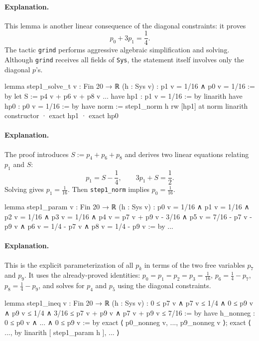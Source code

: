 \documentclass[11pt]{article}
\begin{document}
\paragraph{Explanation.}
This lemma is another linear consequence of the diagonal constraints: it proves
\[
p_0+3p_1=\frac14.
\]
The tactic \texttt{grind} performs aggressive algebraic simplification and solving.  Although \texttt{grind} receives all fields of \texttt{Sys}, the statement itself involves only the diagonal $p$'s.

\begin{LeanCode}
lemma step1_solve_t {v : Fin 20 → ℝ} (h : Sys v) : p1 v = 1/16 ∧ p0 v = 1/16 := by
  let S := p4 v + p6 v + p8 v
  ...
  have hp1 : p1 v = 1/16 := by linarith
  have hp0 : p0 v = 1/16 := by
    have norm := step1_norm h
    rw [hp1] at norm
    linarith
  constructor
  · exact hp1
  · exact hp0
\end{LeanCode}

\paragraph{Explanation.}
The proof introduces $S:=p_4+p_6+p_8$ and derives two linear equations relating $p_1$ and $S$:
\[
p_1 = S-\frac14,\qquad 3p_1+S=\frac12.
\]
Solving gives $p_1=\frac1{16}$.  Then \texttt{step1\_norm} implies $p_0=\frac1{16}$.

\begin{LeanCode}
lemma step1_param {v : Fin 20 → ℝ} (h : Sys v) :
  p0 v = 1/16 ∧ p1 v = 1/16 ∧ p2 v = 1/16 ∧ p3 v = 1/16 ∧
  p4 v = p7 v + p9 v - 3/16 ∧ p5 v = 7/16 - p7 v - p9 v ∧
  p6 v = 1/4 - p7 v ∧ p8 v = 1/4 - p9 v := by
  ...
\end{LeanCode}

\paragraph{Explanation.}
This is the explicit parameterization of all $p_k$ in terms of the two free variables $p_7$ and $p_9$.
It uses the already-proved identities:
$p_0=p_1=p_2=p_3=\frac1{16}$,
$p_6=\frac14-p_7$,
$p_8=\frac14-p_9$,
and solves for $p_4$ and $p_5$ using the diagonal constraints.

\begin{LeanCode}
lemma step1_ineq {v : Fin 20 → ℝ} (h : Sys v) :
  0 ≤ p7 v ∧ p7 v ≤ 1/4 ∧
  0 ≤ p9 v ∧ p9 v ≤ 1/4 ∧
  3/16 ≤ p7 v + p9 v ∧ p7 v + p9 v ≤ 7/16 := by
  have h_nonneg : 0 ≤ p0 v ∧ ... ∧ 0 ≤ p9 v := by
    exact ⟨ p0_nonneg v, ..., p9_nonneg v ⟩;
  exact ⟨ ..., by linarith [ step1_param h ], ... ⟩
\end{LeanCode}
\end{document}
